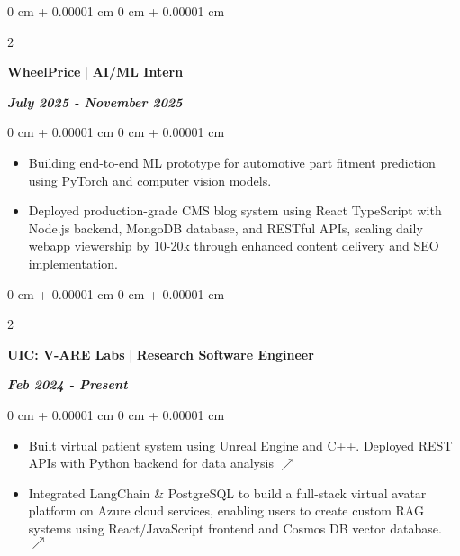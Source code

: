 \documentclass[10pt, letterpaper]{article}
\newenvironment{highlights}{
    \begin{itemize}[
        topsep=0.10 cm,
        parsep=0.10 cm,
        partopsep=0pt,
        itemsep=0pt,
        leftmargin=0 cm + 10pt
    ]
}{
    \end{itemize}
} %
\newenvironment{onecolentry}{
    \begin{adjustwidth}{
        0 cm + 0.00001 cm
    }{
        0 cm + 0.00001 cm
    }
}{
    \end{adjustwidth}
} %
\newenvironment{twocolentry}[2][]{
    \onecolentry
    \def\secondColumn{#2}
    \setcolumnwidth{\fill, 4.5 cm}
    \begin{paracol}{2}
}{
    \switchcolumn \raggedleft \secondColumn
    \end{paracol}
    \endonecolentry
} %
\begin{document}
\begin{twocolentry}{\textit{\textbf{July 2025 - November 2025}}}
   \textbf{WheelPrice} | \textbf{AI/ML Intern}
\end{twocolentry}
\vspace{0.10 cm}
\begin{onecolentry}
    \begin{highlights}
\item Building end-to-end ML prototype for automotive part fitment prediction using PyTorch and computer vision models.
    \end{highlights}
    \begin{highlights}
\item Deployed production-grade CMS blog system using React TypeScript with Node.js backend, MongoDB database, and RESTful APIs, scaling daily webapp viewership by 10-20k through enhanced content delivery and SEO implementation.
    \end{highlights}
\end{onecolentry}

        
\begin{twocolentry}{\textit{\textbf{Feb 2024 - Present}}}
   \textbf{UIC: V-ARE Labs} | \textbf{Research Software Engineer}
\end{twocolentry}
\vspace{0.10 cm}
\begin{onecolentry}

    \begin{highlights}
\item Built virtual patient system using Unreal Engine and C++. Deployed REST APIs with Python backend for data analysis \href{https://github.com/PranavMishra17/EQUITY-VirtualPatient-UE5}{\textbf{$\nearrow$}}

    \end{highlights}
    \begin{highlights}
\item Integrated LangChain \& PostgreSQL to build a full-stack virtual avatar platform on Azure cloud services, enabling users to create custom RAG systems using React/JavaScript frontend and Cosmos DB vector database. \href{https://github.com/PranavMishra17/MedRAG-Avatar-Platform-IVORY}{\textbf{$\nearrow$}}
    \end{highlights}
\end{onecolentry}

\vspace{0.10 cm}
\end{document}
